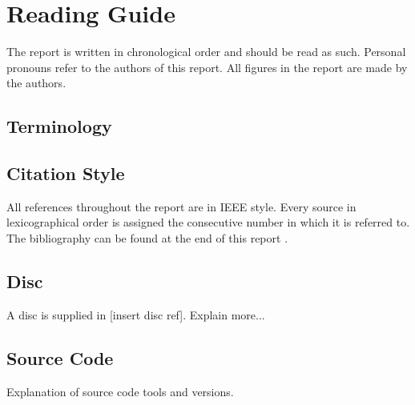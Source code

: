 \chapter*{Reading Guide}
The report is written in chronological order and should be read as such. Personal pronouns refer to the authors of this report. All figures in the report are made by the authors.
\section*{Terminology}

\section*{Citation Style}
All references throughout the report are in IEEE style. Every source in lexicographical order is assigned the consecutive number in which it is referred to. The bibliography can be found at the end of this report .

\section*{Disc}
A disc is supplied in [insert disc ref]. Explain more... %

\section*{Source Code}
Explanation of source code tools and versions.
